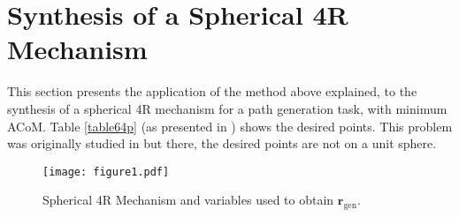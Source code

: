 \documentclass[11pt]{article}
\begin{document}
\section{Synthesis of a Spherical 4R Mechanism}\label{sec3}
This section presents the application of the method above explained, to 
the synthesis of a spherical 4R mechanism for a path generation task, 
with minimum ACoM. Table \ref{table64p} (as presented in 
\cite{Mullineux2011}) shows the desired points. This problem was
originally studied in \cite{ChuSun2010} but there, the desired points 
are not on a unit sphere. 
\begin{figure}[htb]
\begin{center}
\texttt{[image: figure1.pdf]} 
\caption{Spherical 4R Mechanism and variables used to obtain 
$\mathbf{r}_{\text{gen}}$.}
\label{figure1}
\end{center}
\end{figure}
\end{document}
